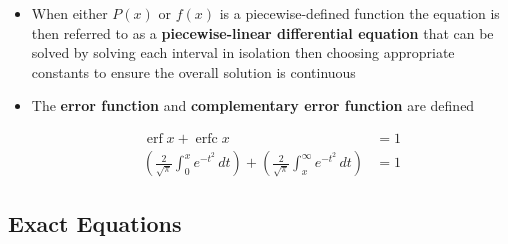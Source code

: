 \documentclass{article}
\DeclareMathOperator{\erf}{erf}
\DeclareMathOperator{\erfc}{erfc}
\begin{document}
\begin{itemize}
  \item When either $P(x)$ or $f(x)$ is a piecewise-defined function the equation is then referred to as a \textbf{piecewise-linear differential equation} that can be solved by solving each interval in isolation then choosing appropriate constants to ensure the overall solution is continuous

  \item The \textbf{error function} and \textbf{complementary error function} are defined

        \begin{align*}
          \erf x + \erfc x                                                                                                              & = 1 \\
          \left( \frac{2}{\sqrt{\pi}} \int_0^x e^{-t^2} \,d t \right) + \left( \frac{2}{\sqrt{\pi}} \int_x^\infty e^{-t^2} \,dt \right) & = 1
        \end{align*}
\end{itemize}

\subsection{Exact Equations}
\end{document}
